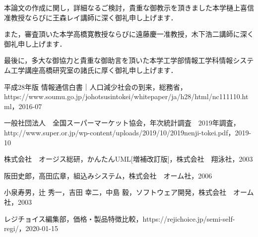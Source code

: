 本論文の作成に関し，詳細なるご検討，貴重な御教示を頂きました本学樋上喜信准教授ならびに王森レイ講師に深く御礼申し上げます．

また，審査頂いた本学高橋寛教授ならびに遠藤慶一准教授，木下浩二講師に深く御礼申し上げます．

最後に，多大な御協力と貴重な御助言を頂いた本学工学部情報工学科情報システム工学講座高橋研究室の諸氏に厚く御礼申し上げます．


\begin{thebibliography}{99}

平成28年版 情報通信白書｜人口減少社会の到来，総務省，https://www.soumu.go.jp/johotsusintokei/whitepaper/ja/h28/html/nc111110.html，2016-07


一般社団法人　全国スーパーマーケット協会，年次統計調査　2019年調査，http://www.super.or.jp/wp-content/uploads/2019/10/2019nenji-tokei.pdf，2019-10


株式会社　オージス総研，かんたんUML[増補改訂版]，株式会社　翔泳社，2003


阪田史郎，高田広章，組込みシステム，株式会社　オーム社，2006


小泉寿男，辻 秀一，吉田 幸二，中島 毅，ソフトウェア開発，株式会社　オーム社，2003


レジチョイス編集部，価格・製品特徴比較，https://rejichoice.jp/semi-self-regi/，2020-01-15


\end{thebibliography}

